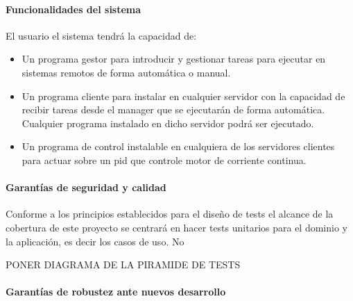 \paragraph{Funcionalidades del sistema}

El usuario el sistema tendrá la capacidad de:

\begin{itemize}
    \item Un programa gestor para introducir y gestionar tareas para ejecutar en sistemas remotos de forma automática o manual.
    \item Un programa cliente para instalar en cualquier servidor con la capacidad de recibir tareas desde el manager que se ejecutarán de forma automática. Cualquier programa instalado en dicho servidor podrá ser ejecutado.
    \item Un programa de control instalable en cualquiera de los servidores clientes para actuar sobre un pid que controle motor de corriente continua.
\end{itemize}

\paragraph{Garantías de seguridad y calidad}\label{par:testing}
    Conforme a los principios establecidos para el diseño de tests el alcance de la cobertura de este proyecto se centrará en hacer tests unitarios para el dominio y la aplicación, es decir los casos de uso. No

    PONER DIAGRAMA DE LA PIRAMIDE DE TESTS
%    

\paragraph{Garantías de robustez ante nuevos desarrollo}






